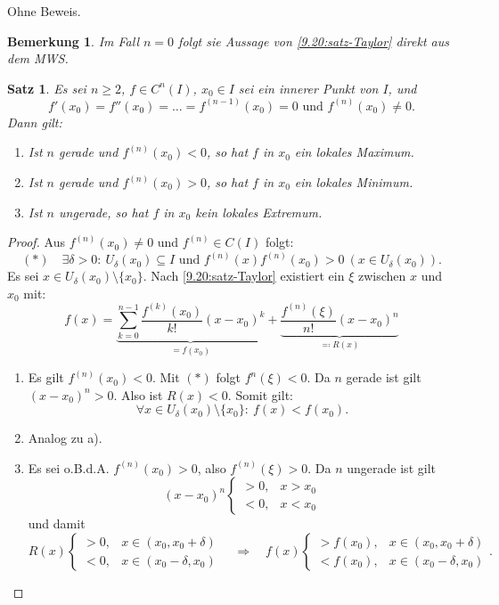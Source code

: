 \documentclass[12pt]{extreport} %
\theoremstyle{named}
\theoremstyle{itshape}
\newtheorem{satz}[unnamedtheorem]{Satz}
\theoremstyle{normal}
\newtheorem*{bemerkung}{Bemerkung}
\begin{document}
{Ohne Beweis.

\begin{bemerkung}
	Im Fall $n = 0$ folgt sie Aussage von \ref{9.20:satz-Taylor} direkt aus dem MWS.	
\end{bemerkung}


\begin{satz} \label{9.21:satz}
	Es sei $n \geq 2$, $f \in C^{n}(I)$, $x_{0} \in I$ sei ein innerer Punkt von $I$, und
	$$ f'(x_{0}) = f''(x_{0}) = \dotsc = f^{(n-1)}(x_{0}) = 0 \text{ und } f^{(n)}(x_{0}) \neq 0. $$
	Dann gilt:
	\begin{enumerate}
		\item Ist $n$ gerade und $f^{(n)}(x_{0}) < 0$, so hat $f$ in $x_{0}$ ein lokales Maximum.
		\item Ist $n$ gerade und $f^{(n)}(x_{0}) > 0$, so hat $f$ in $x_{0}$ ein lokales Minimum.
		\item Ist $n$ ungerade, so hat $f$ in $x_{0}$ kein lokales Extremum. 
	\end{enumerate}	
\end{satz}

\begin{proof}
	Aus $f^{(n)}(x_{0}) \neq 0$ und $f^{(n)} \in C(I)$ folgt: 
	$$ (\ast) \quad \exists \delta > 0: ~ U_{\delta}(x_{0}) \subseteq I \text{ und }  f^{(n)}(x) f^{(n)}(x_0) > 0 ~ (x \in U_{\delta}(x_{0})).$$
	Es sei $x \in U_{\delta}(x_{0}) \setminus \{ x_{0} \}.$ Nach \ref{9.20:satz-Taylor} existiert ein $\xi$ zwischen $x$ und $x_{0}$ mit:
	$$ f(x) = \underbrace{\sum_{k=0}^{n-1} \frac{f^{(k)}(x_{0})}{k!} (x - x_{0})^{k}}_{= f(x_{0})} + \underbrace{\frac{f^{(n)}(\xi)}{n!} (x - x_{0})^{n}}_{\eqqcolon R(x)} $$
	\begin{enumerate}
		\item Es gilt $f^{(n)}(x_{0}) < 0$. Mit $(\ast)$ folgt $f^{n}(\xi) < 0$. Da $n$ gerade ist gilt $(x - x_{0})^{n} > 0$. Also ist $R(x) < 0$. Somit gilt: 
		      $$\forall x \in U_{\delta}(x_{0}) \setminus \{ x_{0} \}: ~ f(x) < f(x_{0}).$$
		\item Analog zu a).
		\item Es sei o.B.d.A. $f^{(n)}(x_{0}) > 0$, also $f^{(n)}(\xi) > 0$. Da $n$ ungerade ist gilt
			$$ (x - x_{0})^{n} \begin{cases} > 0, & x > x_{0} \\ < 0, & x < x_{0} \end{cases} $$
			und damit
			$$ R(x) \begin{cases} > 0, & x \in (x_0,x_0+\delta) \\ < 0, & x \in (x_0-\delta,x_0) \end{cases} 
			\quad \Rightarrow  \quad f(x) \begin{cases} > f(x_{0}), & x \in (x_0,x_0+\delta)  \\ < f(x_{0}), & x  \in (x_0-\delta,x_0) \end{cases}.$$
			

\end{enumerate}
\end{proof}}
\end{document}
